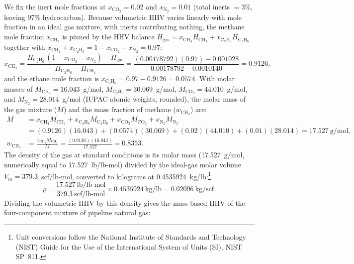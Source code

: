 \documentclass[11pt]{article}
\newcommand{\cotwo}{\ensuremath{\mathrm{CO_2}}}
\newcommand{\chfour}{\ensuremath{\mathrm{CH_4}}}
\begin{document}
We fix the inert mole fractions at $x_{\cotwo{}} = 0.02$ and $x_{\text{N}_2} = 0.01$ (total inerts $= 3\%$, leaving 97\% hydrocarbon). Because volumetric HHV varies linearly with mole fraction in an ideal gas mixture, with inerts contributing nothing, the methane mole fraction $x_{\chfour}$ is pinned by the HHV balance $H_{\text{gas}} = x_{\chfour} H_{\chfour} + x_{\text{C}_2\text{H}_6} H_{\text{C}_2\text{H}_6}$ together with $x_{\chfour} + x_{\text{C}_2\text{H}_6} = 1 - x_{\cotwo{}} - x_{\text{N}_2} = 0.97$:
%
\begin{equation}
    x_{\chfour} = \frac{H_{\text{C}_2\text{H}_6}\,(1 - x_{\cotwo{}} - x_{\text{N}_2}) - H_{\text{gas}}}{H_{\text{C}_2\text{H}_6} - H_{\chfour}} = \frac{(0.00178792)(0.97) - 0.001028}{0.00178792 - 0.0010140} = 0.9126,
    \label{eq:mole_fraction}
\end{equation}
%
and the ethane mole fraction is $x_{\text{C}_2\text{H}_6} = 0.97 - 0.9126 = 0.0574$. With molar masses of $M_{\chfour} = 16.043$~g/mol, $M_{\text{C}_2\text{H}_6} = 30.069$~g/mol, $M_{\cotwo{}} = 44.010$~g/mol, and $M_{\text{N}_2} = 28.014$~g/mol (IUPAC atomic weights, rounded), the molar mass of the gas mixture ($M$) and the mass fraction of methane ($w_{\chfour}$) are:
%
\begin{align}
    M &= x_{\chfour} M_{\chfour} + x_{\text{C}_2\text{H}_6} M_{\text{C}_2\text{H}_6} + x_{\cotwo{}} M_{\cotwo{}} + x_{\text{N}_2} M_{\text{N}_2} \nonumber \\
      &= (0.9126)(16.043) + (0.0574)(30.069) + (0.02)(44.010) + (0.01)(28.014) = 17.527~\text{g/mol}, \label{eq:molar_mass} \\
    w_{\chfour} &= \frac{x_{\chfour} M_{\chfour}}{M} = \frac{(0.9126)(16.043)}{17.527} = 0.8353. \label{eq:mass_fraction}
\end{align}
%
The density of the gas at standard conditions is its molar mass (17.527~g/mol, numerically equal to 17.527~lb/lb-mol) divided by the ideal-gas molar volume $V_m = 379.3$~scf/lb-mol, converted to kilograms at 0.4535924~kg/lb:\footnote{Unit conversions follow the National Institute of Standards and Technology (NIST) Guide for the Use of the International System of Units (SI), NIST SP~811.}
%
\begin{equation}
    \rho = \frac{17.527~\text{lb/lb-mol}}{379.3~\text{scf/lb-mol}} \times 0.4535924~\text{kg/lb} = 0.02096~\text{kg/scf}.
    \label{eq:rho}
\end{equation}
%
Dividing the volumetric HHV by this density gives the mass-based HHV of the four-component mixture of pipeline natural gas:
\end{document}

